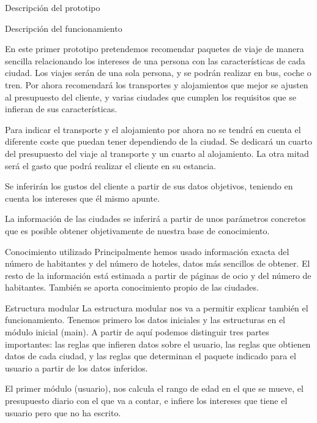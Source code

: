 \documentclass[11pt, a4paper, spanish, openright, twoside]{book}
\begin{document}
\begin{section}{Descripción del prototipo}
	\begin{subsection}{Descripción del funcionamiento}
	
	En este primer prototipo pretendemos recomendar paquetes de viaje de manera sencilla relacionando los intereses de una persona con las características de cada ciudad. Los viajes serán de una sola persona, y se podrán realizar en bus, coche o tren.
Por ahora recomendará los transportes y alojamientos que mejor se ajusten al presupuesto del cliente, y varias ciudades que cumplen los requisitos que se infieran de sus características.

Para indicar el transporte y el alojamiento por ahora no se tendrá en cuenta el diferente coste que puedan tener dependiendo de 
la ciudad. Se dedicará un cuarto del presupuesto del viaje al transporte y un cuarto al alojamiento. La otra mitad será el gasto que podrá realizar el cliente en su estancia. 

Se inferirán los gustos del cliente a partir de sus datos objetivos, teniendo en cuenta los intereses que él mismo apunte.

La información de las ciudades se inferirá a partir de unos parámetros concretos que es posible obtener objetivamente 
de nuestra base de conocimiento.
	\end{subsection}
	
	\begin{subsection}{Conocimiento utilizado}
		Principalmente hemos usado información exacta del número de habitantes y del número de hoteles, datos más sencillos de obtener. El resto de la información está estimada a partir de páginas de ocio y del número de habitantes. También se aporta conocimiento propio de las ciudades.

	\end{subsection}
	
	\begin{subsection}{Estructura modular}
	La estructura modular nos va a permitir explicar también el funcionamiento. Tenemos primero los datos iniciales y las estructuras en el módulo inicial (main). A partir de aquí podemos distinguir tres partes importantes: las reglas que infieren datos sobre el usuario, las reglas que obtienen datos de cada ciudad, y las reglas que determinan el paquete indicado para el usuario a partir de los datos inferidos.
	
	El primer módulo (usuario), nos calcula el rango de edad en el que se mueve, el presupuesto diario con el que va a contar, e infiere los intereses que tiene el usuario pero que no ha escrito.
	

\end{subsection}
\end{section}
\end{document}
